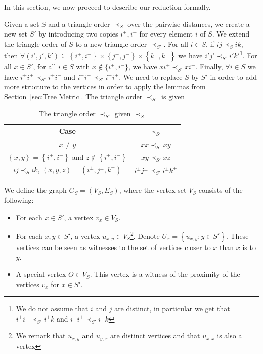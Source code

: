 \documentclass[11pt, letter]{article}
\theoremstyle{remark}
\newcommand{\set}[1]{\left\{#1\right\}}
\begin{document}
In this section, we now proceed to describe our reduction formally. 

Given a set $S$ and a triangle order $\prec_S$ over the pairwise distances, we create a new set $S'$ by introducing two copies $i^+,i^-$ for every element $i$ of $S$. We extend the triangle order of $S$ to a new triangle order $\prec_{S'}$. For all $i\in S$, if $ij\prec_S ik$, then $\forall (i',j',k')\subseteq \set{i^+,i^-}\times \set{j^+,j^-}\times \set{k^+,k^-}$ we have $i'j'\prec_{S'} i'k'$\footnote{We do not assume that $i$ and $j$ are distinct, in particular we get that $i^+i^-\prec_{S'} i^+ k$ and $i^- i^+ \prec_{S'} i^- k$}. 
For all $x\in S'$, for all $i\in S$ with $x\notin \{i^+,i^-\}$, we have $xi^+\prec_{S'} xi^-$. Finally, $\forall i\in S$ we have $i^+i^+ \prec_{S'} i^+i^-$ and $i^-i^- \prec_{S'} i^-i^+$. We need to replace $S$ by $S'$ in order to add more structure to the vertices in order to apply the lemmas from Section~\ref{sec:Tree Metric}. The triangle order $\prec_{S'}$ is given

\begin{table}[ht!]
    \centering
    \begin{tabular}{c|c}
         Case & $\prec_{S'}$\\
         \hline
         $x\neq y$ & $xx\prec_{S'} xy$\\
         \hline
         $\set{x,y}=\set{i^+,i^-}$ and $z\notin \set{i^+,i^-}$ & $xy\prec_{S'} xz$\\
         \hline
         $ij\prec_S ik$, $(x,y,z)=(i^\pm,j^\pm,k^\pm)$ & $i^\pm j^\pm\prec_{S'} i^\pm k^\pm$\\
    \end{tabular}
    \caption{The triangle order $\prec_{S'}$ given $\prec_S$}
    \label{tab:S'}
\end{table}

We define the graph $G_S = (V_S, E_S)$, where the vertex set $V_S$ consists of the following:

\begin{itemize}
    \item For each $x \in S'$, a vertex $v_x \in V_S$.
    \item For each $x, y \in S'$, a vertex $u_{x,y} \in V_S$\footnote{We remark that $u_{x,y}$ and $u_{y,x}$ are distinct vertices and that $u_{x,x}$ is also a vertex}. Denote $U_x=\set{u_{x,y}: y\in S'}$. These vertices can be seen as witnesses to the set of vertices closer to $x$ than $x$ is to $y$.
    \item A special vertex $O \in V_S$. This vertex is a witness of the proximity of the vertices $v_x$ for $x\in S'$.
\end{itemize}
\end{document}
